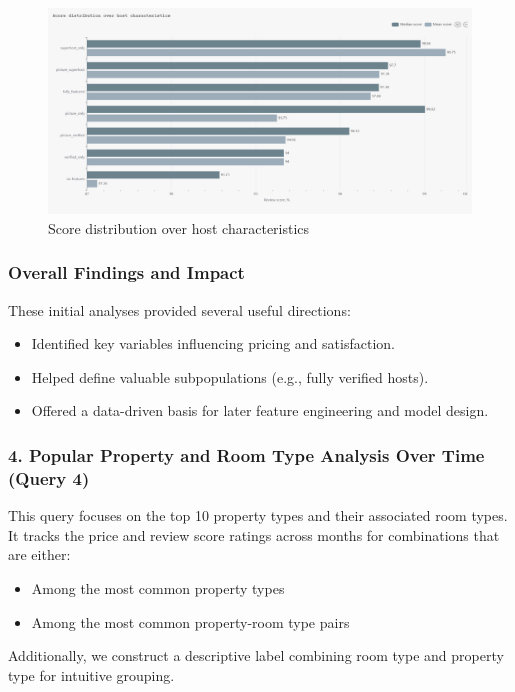 \vspace{1em}
\begin{figure}[H]
    \centering
    \includegraphics[width=1\textwidth]{images/q3_1.jpg}
    \caption{Score distribution over host characteristics}\label{fig:figureq4}
\end{figure}
\subsubsection*{Overall Findings and Impact}

These initial analyses provided several useful directions:
\begin{itemize}
    \item Identified key variables influencing pricing and satisfaction.
    \item Helped define valuable subpopulations (e.g., fully verified hosts).
    \item Offered a data-driven basis for later feature engineering and model design.
\end{itemize}

\subsubsection*{4. Popular Property and Room Type Analysis Over Time (Query 4)}

This query focuses on the top 10 property types and their associated room types. It tracks the price and review score ratings across months for combinations that are either:
\begin{itemize}
    \item Among the most common property types
    \item Among the most common property-room type pairs
\end{itemize}

Additionally, we construct a descriptive label combining room type and property type for intuitive grouping.

